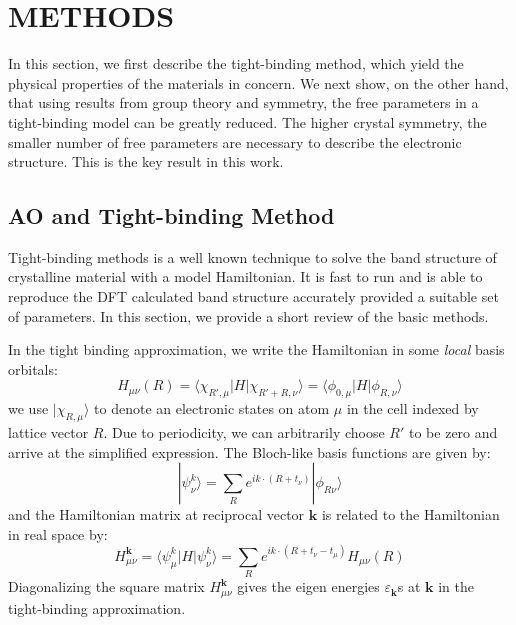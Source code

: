 \documentclass{article}
\begin{document}
\section{METHODS}

In this section, we first describe the tight-binding method, which yield the physical 
properties of the materials in concern. We next show, on the other hand, that using results 
from group theory and symmetry, the free parameters in a tight-binding model can be 
greatly reduced. The higher crystal symmetry, the smaller number of free parameters are 
necessary to describe the electronic structure. This is the key result in this work.

\subsection{AO and Tight-binding Method}
Tight-binding methods is a well known technique to solve the band structure of 
crystalline material with a model Hamiltonian\cite{ziman_principles_1999}. 
It is fast to run and is able to reproduce the DFT calculated band structure accurately 
provided a suitable set of parameters. In this section, we provide a short review of the 
basic methods.

In the tight binding approximation, we write the Hamiltonian in some \emph{local}
basis orbitals:
\begin{equation}
    H_{\mu\nu}(R) = \langle \chi_{R',\mu} | H | \chi_{R'+R,\nu} \rangle = \langle \phi_{0,\mu} | H | \phi_{R,\nu} \rangle
\end{equation}
we use $|\chi_{R,\mu}\rangle$ to denote an electronic states on atom $\mu$ in the cell indexed by lattice vector $R$. 
Due to periodicity, we can arbitrarily choose $R'$ to be zero and arrive at the simplified expression.
The Bloch-like basis functions are given by:
\begin{equation}
    |\psi_{\nu}^k\rangle = \sum_R e^{ik\cdot(R+t_{\nu})} |\phi_{R\nu} \rangle
\end{equation}
and the Hamiltonian matrix at reciprocal vector $\mathbf{k}$ is related to the 
Hamiltonian in real space by:
\begin{equation}
    \label{E:TB}
    H_{\mu\nu}^{\mathbf{k}} = \langle \psi_{\mu}^k | H |\psi_{\nu}^k\rangle = \sum_R e^{ik\cdot(R+t_{\nu}-t_{\mu})} H_{\mu\nu}(R)
\end{equation}
Diagonalizing the square matrix $H_{\mu\nu}^{\mathbf{k}}$ gives the eigen energies $\varepsilon_{\mathbf{k}}$s 
at $\mathbf{k}$ in the tight-binding approximation. 
\end{document}
